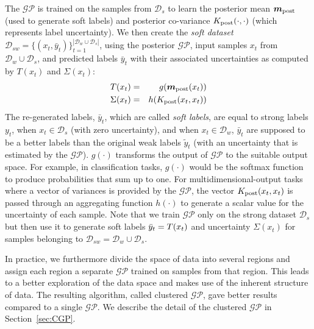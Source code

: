 The $\mathcal{GP}$ is trained on the samples from $\mathcal{D}_s$ to learn the posterior mean $\bm{m}_{\rm post}$ (used to generate soft labels) and posterior co-variance $K_{\rm post}(\cdot,\cdot)$ (which represents label uncertainty).
We then create the \emph{soft dataset} $\mathcal{D}_{sw}=\{(x_t,\bar{y}_t)\}_{t=1}^{|\mathcal{D}_w \cup \mathcal{D}_s|}$, using the posterior $\mathcal{GP}$, input samples $x_t$ from $\mathcal{D}_w \cup \mathcal{D}_s$, and predicted labels $\bar{y}_t$ with their associated uncertainties as computed by $T(x_t)$ and $\Sigma(x_t)$:
\begin{eqnarray*}
\tfunc(x_t) &=& g(\bm{m}_{\rm post}(x_t))\\
\Sigma(x_t) &=& h(K_{\rm post}(x_t,x_t))
\sshrink
\end{eqnarray*}
The re-generated labels, $\bar{y}_t$, which are called \emph{soft labels}, are equal to strong labels $y_t$, when $x_t \in \mathcal{D}_s$ (with zero uncertainty), and when $x_t \in \mathcal{D}_w$, $\bar{y}_t$ are supposed to be a better labels than the original weak labels $\tilde{y}_t$ (with an uncertainty that is estimated by the $\mathcal{GP}$). 
$g(\cdot)$ transforms the output of $\mathcal{GP}$ to the suitable output space. For example, in classification tasks, $g(\cdot)$ would be the softmax function to produce probabilities that sum up to one. 
For multidimensional-output tasks where a vector of variances is provided by the $\mathcal{GP}$, the vector $K_{\rm post}(x_t,x_t)$ is passed through an aggregating function $h(\cdot)$ to generate a scalar value for the uncertainty of each sample. 
Note that we train $\mathcal{GP}$ only on the strong dataset $\mathcal{D}_s$ but then use it to generate soft labels $\bar{y}_t = T(x_t)$ and uncertainty $\Sigma(x_t)$ for samples belonging to $\mathcal{D}_{sw}=\mathcal{D}_w\cup \mathcal{D}_s$.

In practice, we furthermore divide the space of data into several regions and assign each region a separate $\mathcal{GP}$ trained on samples from that region. This leads to a better exploration of the data space and makes use of the inherent structure of data. The resulting algorithm, called clustered $\mathcal{GP}$, gave better results compared to a single $\mathcal{GP}$. We describe the detail of the clustered $\mathcal{GP}$ in Section~\ref{sec:CGP}.

